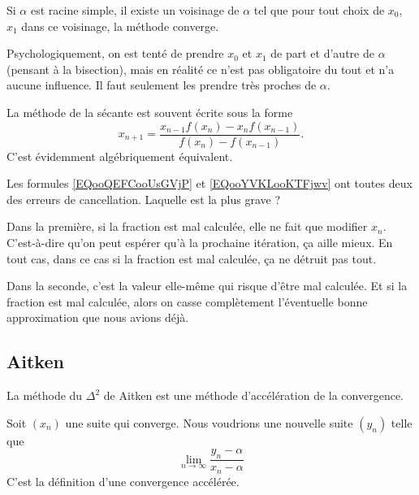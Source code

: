 \begin{proposition}
	Si \( \alpha\) est racine simple, il existe un voisinage de \( \alpha\) tel que pour tout choix de \( x_0\), \( x_1\) dans ce voisinage, la méthode converge.
\end{proposition}

Psychologiquement, on est tenté de prendre \( x_0\) et \( x_1\) de part et d'autre de \( \alpha\) (pensant à la bisection), mais en réalité ce n'est pas obligatoire du tout et n'a aucune influence. Il faut seulement les prendre très proches de \( \alpha\).

\begin{remark}
	La méthode de la sécante est souvent écrite sous la forme
	\begin{equation}        \label{EQooYVKLooKTFjwv}
		x_{n+1}=\frac{ x_{n-1}f(x_n)-x_nf(x_{n-1}) }{ f(x_n)-f(x_{n-1}) }.
	\end{equation}
	C'est évidemment algébriquement équivalent.

	Les formules \eqref{EQooQEFCooUsGVjP} et \eqref{EQooYVKLooKTFjwv} ont toutes deux des erreurs de cancellation. Laquelle est la plus grave ?

	Dans la première, si la fraction est mal calculée, elle ne fait que modifier \( x_n\). C'est-à-dire qu'on peut espérer qu'à la prochaine itération, ça aille mieux. En tout cas, dans ce cas si la fraction est mal calculée, ça ne détruit pas tout.

	Dans la seconde, c'est la valeur elle-même qui risque d'être mal calculée. Et si la fraction est mal calculée, alors on casse complètement l'éventuelle bonne approximation que nous avions déjà.
\end{remark}

\subsection{Aitken}

La méthode du \( \Delta^2\) de Aitken est une méthode d'accélération de la convergence.

Soit \( (x_n)\) une suite qui converge. Nous voudrions une nouvelle suite \( (y_n)\) telle que
\begin{equation}
	\lim_{n\to \infty} \frac{ y_n-\alpha }{ x_n-\alpha }
\end{equation}
C'est la définition d'une convergence accélérée.


